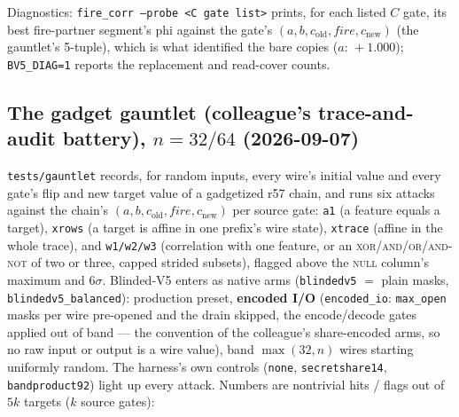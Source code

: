\documentclass[11pt]{article}
\newcommand{\doc}[1]{\texttt{#1}}
\begin{document}
Diagnostics: \doc{fire\_corr --probe <C gate list>} prints, for each listed $C$
gate, its best fire-partner segment's phi against the gate's $(a, b, c_{\mathrm{old}},
\mathit{fire}, c_{\mathrm{new}})$ (the gauntlet's 5-tuple), which is what identified
the bare copies ($a{:}\,{+}1.000$); \doc{BV5\_DIAG=1} reports the replacement and
read-cover counts.

\subsection{The gadget gauntlet (colleague's trace-and-audit battery), $n=32/64$ (2026-09-07)}

\doc{tests/gauntlet} records, for random inputs, every wire's initial value and
every gate's flip and new target value of a gadgetized r57 chain, and runs six
attacks against the chain's $(a,b,c_{\mathrm{old}},\mathit{fire},c_{\mathrm{new}})$
per source gate: \doc{a1} (a feature equals a target), \doc{xrows} (a target is
affine in one prefix's wire state), \doc{xtrace} (affine in the whole trace), and
\doc{w1/w2/w3} (correlation with one feature, or an \textsc{xor/and/or/and-not} of
two or three, capped strided subsets), flagged above the \textsc{null} column's
maximum and $6\sigma$. Blinded-V5 enters as native arms (\doc{blindedv5} $=$ plain masks,
\doc{blindedv5\_balanced}): production preset, \textbf{encoded I/O}
(\doc{encoded\_io}: \doc{max\_open} masks per wire pre-opened and the drain skipped,
the encode/decode gates applied out of band --- the convention of the colleague's
share-encoded arms, so no raw input or output is a wire value), band $\max(32,n)$
wires starting uniformly random. The harness's own controls (\doc{none},
\doc{secretshare14}, \doc{bandproduct92}) light up every attack. Numbers are
nontrivial hits / flags out of $5k$ targets ($k$ source gates):
\end{document}
